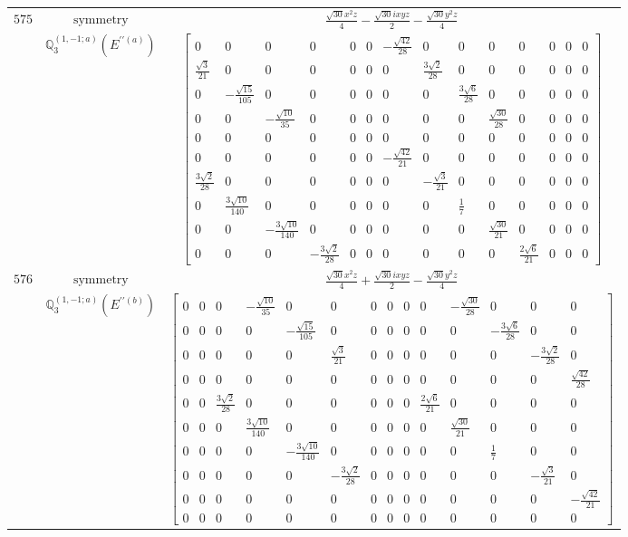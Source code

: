 \documentclass[fleqn,8pt,landscape]{jsarticle}
\begin{document}
\begin{longtable}{ccc}
$ 575 $ & $ \text{symmetry} $ & $ \frac{\sqrt{30} x^{2} z}{4} - \frac{\sqrt{30} i x y z}{2} - \frac{\sqrt{30} y^{2} z}{4} $ \\
$  $ & $ \mathbb{Q}_{3}^{(1,-1;a)}(E^{\prime\prime(a)}) $ & $ \begin{bmatrix} 0 & 0 & 0 & 0 & 0 & 0 & - \frac{\sqrt{42}}{28} & 0 & 0 & 0 & 0 & 0 & 0 & 0 \\ \frac{\sqrt{3}}{21} & 0 & 0 & 0 & 0 & 0 & 0 & \frac{3 \sqrt{2}}{28} & 0 & 0 & 0 & 0 & 0 & 0 \\ 0 & - \frac{\sqrt{15}}{105} & 0 & 0 & 0 & 0 & 0 & 0 & \frac{3 \sqrt{6}}{28} & 0 & 0 & 0 & 0 & 0 \\ 0 & 0 & - \frac{\sqrt{10}}{35} & 0 & 0 & 0 & 0 & 0 & 0 & \frac{\sqrt{30}}{28} & 0 & 0 & 0 & 0 \\ 0 & 0 & 0 & 0 & 0 & 0 & 0 & 0 & 0 & 0 & 0 & 0 & 0 & 0 \\ 0 & 0 & 0 & 0 & 0 & 0 & - \frac{\sqrt{42}}{21} & 0 & 0 & 0 & 0 & 0 & 0 & 0 \\ \frac{3 \sqrt{2}}{28} & 0 & 0 & 0 & 0 & 0 & 0 & - \frac{\sqrt{3}}{21} & 0 & 0 & 0 & 0 & 0 & 0 \\ 0 & \frac{3 \sqrt{10}}{140} & 0 & 0 & 0 & 0 & 0 & 0 & \frac{1}{7} & 0 & 0 & 0 & 0 & 0 \\ 0 & 0 & - \frac{3 \sqrt{10}}{140} & 0 & 0 & 0 & 0 & 0 & 0 & \frac{\sqrt{30}}{21} & 0 & 0 & 0 & 0 \\ 0 & 0 & 0 & - \frac{3 \sqrt{2}}{28} & 0 & 0 & 0 & 0 & 0 & 0 & \frac{2 \sqrt{6}}{21} & 0 & 0 & 0 \end{bmatrix} $ \\ \hline
$ 576 $ & $ \text{symmetry} $ & $ \frac{\sqrt{30} x^{2} z}{4} + \frac{\sqrt{30} i x y z}{2} - \frac{\sqrt{30} y^{2} z}{4} $ \\
$  $ & $ \mathbb{Q}_{3}^{(1,-1;a)}(E^{\prime\prime(b)}) $ & $ \begin{bmatrix} 0 & 0 & 0 & - \frac{\sqrt{10}}{35} & 0 & 0 & 0 & 0 & 0 & 0 & - \frac{\sqrt{30}}{28} & 0 & 0 & 0 \\ 0 & 0 & 0 & 0 & - \frac{\sqrt{15}}{105} & 0 & 0 & 0 & 0 & 0 & 0 & - \frac{3 \sqrt{6}}{28} & 0 & 0 \\ 0 & 0 & 0 & 0 & 0 & \frac{\sqrt{3}}{21} & 0 & 0 & 0 & 0 & 0 & 0 & - \frac{3 \sqrt{2}}{28} & 0 \\ 0 & 0 & 0 & 0 & 0 & 0 & 0 & 0 & 0 & 0 & 0 & 0 & 0 & \frac{\sqrt{42}}{28} \\ 0 & 0 & \frac{3 \sqrt{2}}{28} & 0 & 0 & 0 & 0 & 0 & 0 & \frac{2 \sqrt{6}}{21} & 0 & 0 & 0 & 0 \\ 0 & 0 & 0 & \frac{3 \sqrt{10}}{140} & 0 & 0 & 0 & 0 & 0 & 0 & \frac{\sqrt{30}}{21} & 0 & 0 & 0 \\ 0 & 0 & 0 & 0 & - \frac{3 \sqrt{10}}{140} & 0 & 0 & 0 & 0 & 0 & 0 & \frac{1}{7} & 0 & 0 \\ 0 & 0 & 0 & 0 & 0 & - \frac{3 \sqrt{2}}{28} & 0 & 0 & 0 & 0 & 0 & 0 & - \frac{\sqrt{3}}{21} & 0 \\ 0 & 0 & 0 & 0 & 0 & 0 & 0 & 0 & 0 & 0 & 0 & 0 & 0 & - \frac{\sqrt{42}}{21} \\ 0 & 0 & 0 & 0 & 0 & 0 & 0 & 0 & 0 & 0 & 0 & 0 & 0 & 0 \end{bmatrix} $ \\ \hline

\end{longtable}
\end{document}
